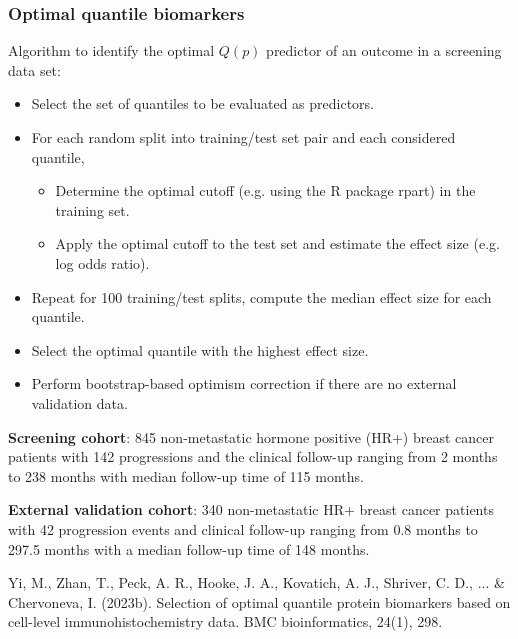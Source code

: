 \documentclass[t,8pt]{beamer}
\begin{document}
\frame
   {\frametitle{Optimal quantile biomarkers \cite{Yi23BMC}}  
Algorithm to identify the optimal $Q(p)$ predictor of an outcome in a screening data set:\\
	 \begin{itemize} 
	\item Select the set of quantiles to be evaluated as predictors.\\
	\item  For each random split into training/test set pair and each considered quantile, \\
		 \begin{itemize} 
   \item Determine the optimal cutoff (e.g. using the R package rpart) in the training set. \\
  \item  Apply the optimal cutoff to the test set and estimate the effect size (e.g. log odds ratio).\\
   	 \end{itemize} 
  \item  Repeat for 100 training/test splits, compute the median effect size for each quantile.\\
  \item  Select the optimal quantile with the highest effect size. \\
  \item Perform bootstrap-based optimism correction if there are no external validation data. 
   	 \end{itemize} 
\bigskip

\textbf{Screening cohort}: 845 non-metastatic hormone positive (HR+)
breast cancer patients with 142 progressions and the clinical follow-up ranging from
2 months to 238 months with median follow-up time of 115 months.

\textbf{External validation cohort}: 340 non-metastatic HR+ breast cancer patients with 42
progression events and clinical follow-up ranging from 0.8 months to 297.5 months with a median follow-up time of 148 months.

\bigskip
\begin{thebibliography}{ }	
\begin{small}
Yi, M., Zhan, T., Peck, A. R., Hooke, J. A., Kovatich, A. J., Shriver, C. D., ... & Chervoneva, I. (2023b). Selection of optimal quantile protein biomarkers based on cell-level immunohistochemistry data. BMC bioinformatics, 24(1), 298.
\end{small}
\end{thebibliography}
}
\end{document}
